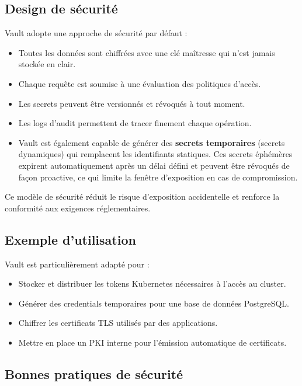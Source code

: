 \subsection{Design de sécurité}

Vault adopte une approche de sécurité par défaut :
\begin{itemize}
	\item Toutes les données sont chiffrées avec une clé maîtresse qui n’est jamais stockée en clair.
	\item Chaque requête est soumise à une évaluation des politiques d’accès.
	\item Les secrets peuvent être versionnés et révoqués à tout moment.
	\item Les logs d’audit permettent de tracer finement chaque opération.
	\item Vault est également capable de générer des \textbf{secrets temporaires} (secrets dynamiques) qui remplacent les identifiants statiques. Ces secrets éphémères expirent automatiquement après un délai défini et peuvent être révoqués de façon proactive, ce qui limite la fenêtre d’exposition en cas de compromission.
\end{itemize}

Ce modèle de sécurité réduit le risque d’exposition accidentelle et renforce la conformité aux exigences réglementaires.

\subsection{Exemple d’utilisation}

Vault est particulièrement adapté pour :
\begin{itemize}
	\item Stocker et distribuer les tokens Kubernetes nécessaires à l’accès au cluster.
	\item Générer des credentials temporaires pour une base de données PostgreSQL.
	\item Chiffrer les certificats TLS utilisés par des applications.
	\item Mettre en place un PKI interne pour l’émission automatique de certificats.
\end{itemize}

\subsection{Bonnes pratiques de sécurité}


